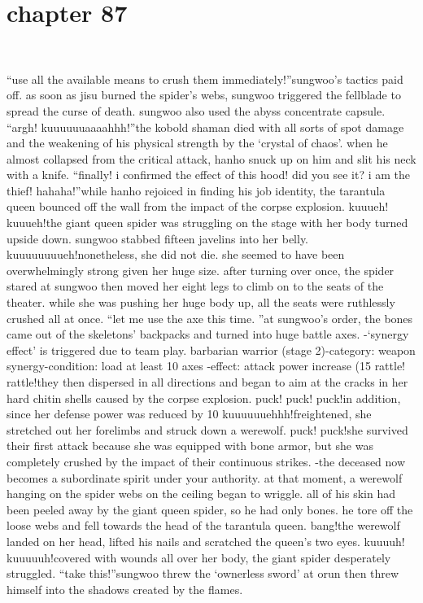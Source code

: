 \section{chapter 87}

                             




“use all the available means to crush them immediately!”sungwoo’s tactics paid off.
as soon as jisu burned the spider’s webs, sungwoo triggered the fellblade to spread the curse of death.
 sungwoo also used the abyss concentrate capsule.
“argh! kuuuuuuaaaahhh!”the kobold shaman died with all sorts of spot damage and the weakening of his physical strength by the ‘crystal of chaos’.
 when he almost collapsed from the critical attack, hanho snuck up on him and slit his neck with a knife.
“finally! i confirmed the effect of this hood! did you see it? i am the thief! hahaha!”while hanho rejoiced in finding his job identity, the tarantula queen bounced off the wall from the impact of the corpse explosion.
kuuueh! kuuueh!the giant queen spider was struggling on the stage with her body turned upside down.
sungwoo stabbed fifteen javelins into her belly.
kuuuuuuuueh!nonetheless, she did not die.
 she seemed to have been overwhelmingly strong given her huge size.
after turning over once, the spider stared at sungwoo then moved her eight legs to climb on to the seats of the theater.
 while she was pushing her huge body up, all the seats were ruthlessly crushed all at once.
“let me use the axe this time.
”at sungwoo’s order, the bones came out of the skeletons’ backpacks and turned into huge battle axes.
-‘synergy effect’ is triggered due to team play.
barbarian warrior (stage 2)-category: weapon synergy-condition: load at least 10 axes
-effect: attack power increase (15%
rattle! rattle!they then dispersed in all directions and began to aim at the cracks in her hard chitin shells caused by the corpse explosion.
puck! puck! puck!in addition, since her defense power was reduced by 10%
kuuuuuuehhh!freightened, she stretched out her forelimbs and struck down a werewolf.
puck! puck!she survived their first attack because she was equipped with bone armor, but she was completely crushed by the impact of their continuous strikes.
-the deceased now becomes a subordinate spirit under your authority.
at that moment, a werewolf hanging on the spider webs on the ceiling began to wriggle.
all of his skin had been peeled away by the giant queen spider, so he had only bones.
 he tore off the loose webs and fell towards the head of the tarantula queen.
bang!the werewolf landed on her head, lifted his nails and scratched the queen’s two eyes.
kuuuuh! kuuuuuh!covered with wounds all over her body, the giant spider desperately struggled.
“take this!”sungwoo threw the ‘ownerless sword’ at orun then threw himself into the shadows created by the flames.

